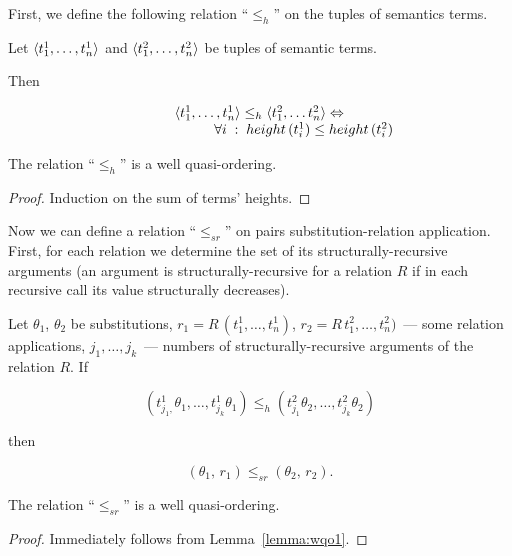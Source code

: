 First, we define the following relation ``$\leq_h$'' on the tuples of semantics terms.

\begin{definition}
  Let $\langle t_1^1, \dots, t_n^1 \rangle$ and $\langle t_1^2, \dots, t_n^2 \rangle$ be tuples of semantic terms. 

  Then

  \[
  \begin{array}{c}
  \langle t_1^1, \ldots, t_n^1 \rangle \leq_h \langle t_1^2, \ldots t_n^2 \rangle \Leftrightarrow\\
  \phantom{XXXXXXX}\forall i\;:\;height\,(t_i^1) \leq height\,(t_i^2)
  \end{array}
  \]
\end{definition}


\begin{lemma}
\label{lemma:wqo1}
The relation ``$\leq_h$'' is a well quasi-ordering.
\end{lemma}
\begin{proof}
  Induction on the sum of terms' heights.
\end{proof}

Now we can define a relation ``$\leq_{sr}$'' on pairs substitution-relation application. First, for each relation we
determine the set of its structurally-recursive arguments (an argument is structurally-recursive for a relation $R$ if in
each recursive call its value structurally decreases). 

\begin{definition}
  Let $\theta_1$, $\theta_2$ be substitutions, \mbox{$r_1=R\,(t^1_1,\dots,t^1_n)$}, \mbox{$r_2=R\,t^2_1,\dots,t^2_n)$}~--- some relation applications, $j_1, \dots, j_k$~---
  numbers of structurally-recursive arguments of the relation $R$. If

  \[
  (t^1_{j_1,}\theta_1,  \dots,  t^1_{j_k}\theta_1) \leq_h (t^2_{j_1}\theta_2, \dots, t^2_{j_k}\theta_2)
  \]

  then
  
  \[
  (\theta_1,\, r_1) \leq_{sr} (\theta_2,\, r_2).
  \]
\end{definition}

\begin{lemma}
\label{lemma:sr-wqo}
The relation ``$\leq_{sr}$'' is a well quasi-ordering.
\end{lemma}
\begin{proof}
  Immediately follows from Lemma~\ref{lemma:wqo1}.
\end{proof}

